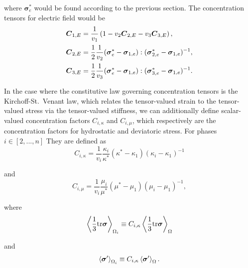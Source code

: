 where \(\boldsymbol{\sigma}_{e}^{*}\) would be found according to the
previous section. The concentration tensors for electric field would be
\begin{equation}\label{eqn:E_cfs}
\begin{array}{l}
\mbox{\boldmath $C$}_{1,E} = \displaystyle\frac{1}{v_{1}} \left( 1 - v_{2} \mbox{\boldmath $C$}_{2,E} - v_{3} \mbox{\boldmath $C$}_{3,E} \right), \\[10pt]
\mbox{\boldmath $C$}_{2,E} = \displaystyle\frac{1}{2}\displaystyle\frac{1}{v_{2}} (\mbox{\boldmath $\sigma$}_{e}^{*} - \mbox{\boldmath $\sigma$}_{1,e}):(\mbox{\boldmath $\sigma$}_{2,e}^{*} - \mbox{\boldmath $\sigma$}_{1,e})^{-1}, \\[10pt]
\mbox{\boldmath $C$}_{3,E} = \displaystyle\frac{1}{2}\displaystyle\frac{1}{v_{3}} (\mbox{\boldmath $\sigma$}_{e}^{*} - \mbox{\boldmath $\sigma$}_{1,e}):(\mbox{\boldmath $\sigma$}_{3,e}^{*} - \mbox{\boldmath $\sigma$}_{1,e})^{-1}.
\end{array}
\end{equation}

In the case where the constitutive law governing concentration tensors
is the Kirchoff-St.~Venant law, which relates the tensor-valued strain
to the tensor-valued stress via the tensor-valued stiffness, we can
additionally define scalar-valued concentration factors \(C_{i,\kappa}\)
and \(C_{i,\mu}\), which respectively are the concentration factors for
hydrostatic and deviatoric stress. For phases \(i\in[2,...,n]\) They are
defined as \begin{equation}\label{eqn:sph-conc-fact}
C_{i,\kappa} = \frac{1}{v_{i}}\frac{\kappa_{i}}{\kappa^{*}}(\kappa^{*} - \kappa_{1})(\kappa_{i} - \kappa_{1})^{-1}
\end{equation}

and \begin{equation}\label{eqn:dev-conc-fact}
C_{i,\mu} = \frac{1}{v_{i}}\frac{\mu_{i}}{\mu^{*}}(\mu^{*} - \mu_{1})(\mu_{i} - \mu_{1})^{-1},
\end{equation}

where \begin{equation}\label{eqn:sph-conc-fact-def}
\left\langle \frac{1}{3}\text{tr}\mbox{\boldmath $\sigma$}\right\rangle_{\Omega_{i}} \equiv C_{i,\kappa} \left\langle \frac{1}{3}\text{tr}\mbox{\boldmath $\sigma$}\right\rangle_{\Omega} 
\end{equation}

and \begin{equation}\label{eqn:dev-conc-fact-def}
\left\langle \mbox{\boldmath $\sigma$}' \right\rangle_{\Omega_{i}} \equiv C_{i,\kappa} \left\langle \mbox{\boldmath $\sigma$}' \right\rangle_{\Omega}.
\end{equation}

